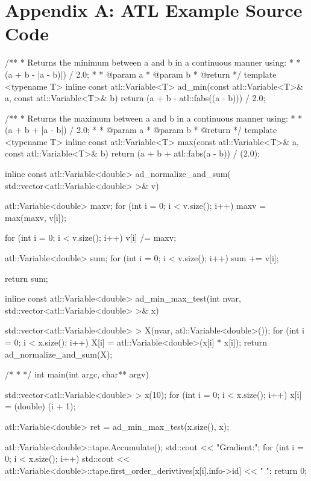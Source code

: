 \documentclass[oneside]{article}
\begin{document}
\section{Appendix A: ATL Example Source Code}

\begin{cppsource}

/**
 * Returns the minimum between a and b in a continuous manner using:
 * 
 * (a + b - |a - b)|) / 2.0;
 * 
 * @param a
 * @param b
 * @return 
 */
template <typename T>
inline const atl::Variable<T> ad_min(const atl::Variable<T>& a, 
const atl::Variable<T>& b) {
    return (a + b - atl::fabs((a - b))) / 2.0;
}

/**
 * Returns the maximum between a and b in a continuous manner using:
 * 
 * (a + b + |a - b|) / 2.0;
 * 
 * @param a
 * @param b
 * @return 
 */
template <typename T>
inline const atl::Variable<T> max(const atl::Variable<T>& a,
 const atl::Variable<T>& b) {
    return (a + b + atl::fabs(a - b)) / (2.0);
}


inline const atl::Variable<double> ad_normalize_and_sum(
std::vector<atl::Variable<double> >& v) {
    atl::Variable<double> maxv;
    for (int i = 0; i < v.size(); i++) {
        maxv = max(maxv, v[i]);
    }

    for (int i = 0; i < v.size(); i++) {
        v[i] /= maxv;
    }

    atl::Variable<double> sum;
    for (int i = 0; i < v.size(); i++) {
        sum += v[i];
    }

    return sum;
}
\end{cppsource}

\begin{cppsource}

inline const atl::Variable<double> ad_min_max_test(int nvar, 
std::vector<atl::Variable<double> >& x) {
    std::vector<atl::Variable<double> > X(nvar, atl::Variable<double>());
    for (int i = 0; i < x.size(); i++) {
        X[i] = atl::Variable<double>(x[i] * x[i]);
    }
    return ad_normalize_and_sum(X);

}

/*
 * 
 */
int main(int argc, char** argv) {


    std::vector<atl::Variable<double> > x(10);
    for (int i = 0; i < x.size(); i++) {
        x[i] = (double) (i + 1);
    }

    atl::Variable<double> ret = ad_min_max_test(x.size(), x);

    atl::Variable<double>::tape.Accumulate();
    std::cout << "Gradient:\n";
    for (int i = 0; i < x.size(); i++) {
        std::cout << 
        atl::Variable<double>::tape.first_order_derivtives[x[i].info->id] << " ";
    }
    return 0;
}

\end{cppsource}
\end{document}
